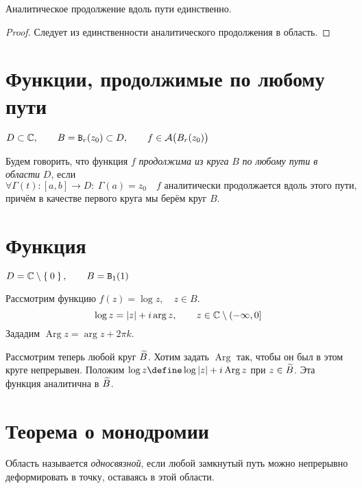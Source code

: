 \begin{theorem}
	Аналитическое продолжение вдоль пути единственно.
\end{theorem}

\begin{proof}
	Следует из единственности аналитического продолжения в область.
\end{proof}

\section{Функции, продолжимые по любому пути}

\begin{definition}
	$ D \subset \mathbb{C}, \qquad B = \mathtt B_r(z_0) \subset D, \qquad f \in \mathcal A \big( B_r(z_0) \big) $

	Будем говорить, что функция $ f $ \emph{продолжима из круга} $ B $ \emph{по любому пути в области} $ D $, если
	$$ \forall \Gamma(t) : [a, b] \to D : ~ \Gamma(a) = z_0 \quad f \text{ аналитически продолжается вдоль этого пути}, $$
	причём в качестве первого круга мы берём круг $ B $.
\end{definition}

\section{Функция }

\begin{eg}
	$ D = \mathbb{C} \setminus \Set0, \qquad B = \mathtt B_1(1) $

	Рассмотрим функцию $ f(z) = \log z, \quad z \in B $.
	$$ \log z = |z| + i \operatorname{arg} z, \qquad z \in \mathbb{C} \setminus (-\infty, 0] $$
	Зададим $ \operatorname{Arg} z = \operatorname{arg} z + 2\pi k $.

	Рассмотрим теперь любой круг $ \widetilde B $.
	Хотим задать $ \operatorname{Arg} $ так, чтобы он был в этом круге непрерывен.
	Положим $ \log z \define \log |z| + i \operatorname{Arg} z $ при $ z \in \widetilde B $.
	Эта функция аналитична в $ \widetilde B $.
\end{eg}

\section{Теорема о монодромии}

\begin{definition}
	Область называется \emph{односвязной}, если любой замкнутый путь можно непрерывно деформировать в точку, оставаясь в этой области.
\end{definition}

